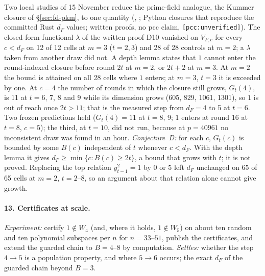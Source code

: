 Two local studies of 15 November reduce the prime-field analogue, the
Kummer closure of \S\ref{sec:fd-pkm}, to one quantity
(,
; Python closures that
reproduce the committed Rust $d_F$ values; written proofs, no pcc claim,
\texttt{[pcc:unverified]}). The closed-form functional $\lambda$ of the
written proof D10 vanished on $V_{F,c}$ for every $c<d_F$ on 12 of 12 cells
at $m=3$ ($t=2,3$) and 28 of 28 controls at $m=2$; a $\lambda$ taken from
another draw did not. A depth lemma states that $1$ cannot enter the
round-indexed closure before round $2t$ at $m=2$, or $2t+2$ at $m=3$. At
$m=2$ the bound is attained on all 28 cells where $1$ enters; at $m=3$,
$t=3$ it is exceeded by one. At $c=4$ the number of rounds in which the
closure still grows, $G_t(4)$, is 11 at $t=6$, 7, 8 and 9 while its
dimension grows (605, 829, 1061, 1301), so $1$ is out of reach once
$2t>11$; that is the measured step from
$d_F=4$ to 5 at $t=6$. Two frozen predictions held ($G_t(4)=11$ at $t=8$,
9; $1$ enters at round 16 at $t=8$, $c=5$); the third, at $t=10$, did not
run, because at $p=40961$ no inconsistent draw was found in an hour.
\emph{Conjecture~D:} for each $c$, $G_t(c)$ is bounded by some $B(c)$ independent of $t$ whenever $c<d_F$. With the depth
lemma it gives $d_F\ge\min\{c: B(c)\ge2t\}$, a bound that grows with $t$;
it is not proved. Replacing the top relation $y_{t-1}^2=1$ by $0$ or $5$
left $d_F$ unchanged on 65 of 65 cells at $m=2$, $t=2$--8, so an argument
about that relation alone cannot give growth.

\paragraph{13. Certificates at scale.} \emph{Experiment:} certify
$1\notin W_4$ (and, where it holds, $1\notin W_5$) on about ten random and
ten polynomial subspaces per $n$ for $n=33$--$51$, publish the
certificates, and extend the guarded chain to $B=4$--$8$ by computation.
\emph{Settles:} whether the step $4\to5$ is a population property, and
where $5\to6$ occurs; the exact $d_F$ of the guarded chain beyond $B=3$.

